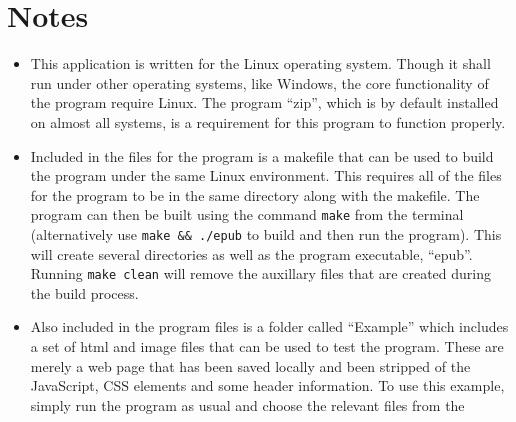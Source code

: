 \documentclass[11pt]{article} %
\newcommand{\code}[1]{\texttt{#1}}
\begin{document}
\section{Notes} %
\label{sec:notes}
\begin{itemize}
  \item This application is written for the Linux operating system. Though it shall run under other operating systems, like Windows, the core functionality of the program require Linux. The program ``zip'', which is by default installed on almost all systems, is a requirement for this program to function properly. 
  \item Included in the files for the program is a makefile that can be used to build the program under the same Linux environment. This requires all of the files for the program to be in the same directory along with the makefile. The program can then be built using the command \code{make} from the terminal (alternatively use \code{make \&\& ./epub} to build and then run the program). This will create several directories as well as the program executable, ``epub''. Running \code{make clean} will remove the auxillary files that are created during the build process.
  \item Also included in the program files is a folder called ``Example'' which includes a set of html and image files that can be used to test the program. These are merely a web page that has been saved locally and been stripped of the JavaScript, CSS elements and some header information. To use this example, simply run the program  as usual and choose the relevant files from the 
\end{itemize}


\newpage
\appendix
{}

\end{document}
